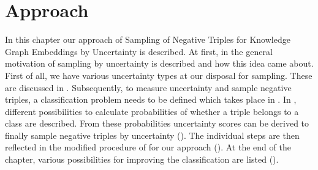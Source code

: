 \chapter{Approach}
\label{ch:approach}

In this chapter our approach of Sampling of Negative Triples for Knowledge Graph Embeddings by Uncertainty is described.
At first, in  the general motivation of sampling by uncertainty is described and how this idea came about.
First of all, we have various uncertainty types at our disposal for sampling.
These are discussed in .
Subsequently, to measure uncertainty and sample negative triples, a classification problem needs to be defined which takes place in .
In , different possibilities to calculate probabilities of whether a triple belongs to a class are described.
From these probabilities uncertainty scores can be derived to finally sample negative triples by uncertainty ().
The individual steps are then reflected in the modified procedure of \kban for our approach ().
At the end of the chapter, various possibilities for improving the classification are listed ().













